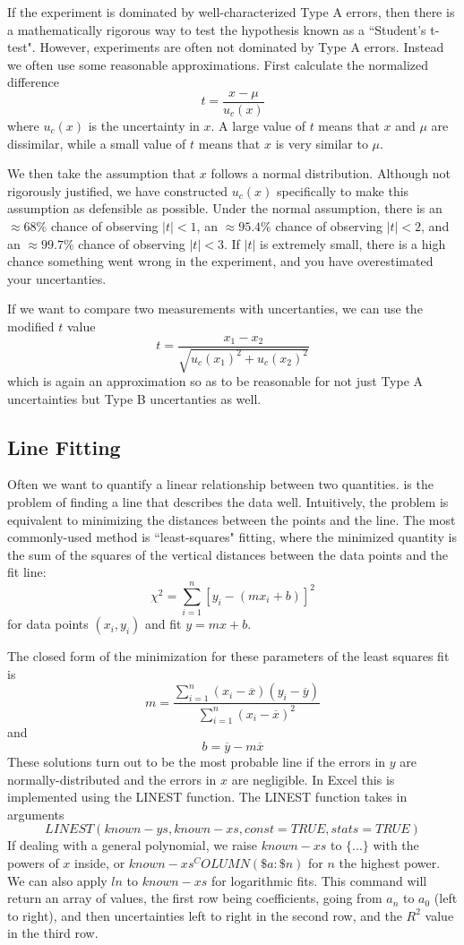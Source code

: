 \documentclass[12pt, a4paper, oneside, openright, titlepage]{book}
\begin{document}
\begin{appendices}
    If the experiment is dominated by well-characterized Type A errors, then there is a mathematically rigorous way to test the hypothesis known as a ``Student's t-test". However, experiments are often not dominated by Type A errors. Instead we often use some reasonable approximations. First calculate the normalized difference $$t = \frac{x-\mu}{u_c(x)}$$ where $u_c(x)$ is the uncertainty in $x$. A large value of $t$ means that $x$ and $\mu$ are dissimilar, while a small value of $t$ means that $x$ is very similar to $\mu$. 

    We then take the assumption that $x$ follows a normal distribution. Although not rigorously justified, we have constructed $u_c(x)$ specifically to make this assumption as defensible as possible. Under the normal assumption, there is an $\approx 68\%$ chance of observing $|t| < 1$, an $\approx 95.4\%$ chance of observing $|t| < 2$, and an $\approx 99.7\%$ chance of observing $|t| < 3$. If $|t|$ is extremely small, there is a high chance something went wrong in the experiment, and you have overestimated your uncertanties.

    If we want to compare two measurements with uncertanties, we can use the modified $t$ value $$t = \frac{x_1 - x_2}{\sqrt{u_c(x_1)^2+u_c(x_2)^2}}$$ which is again an approximation so as to be reasonable for not just Type A uncertainties but Type B uncertanties as well.


    \subsection{Line Fitting}
    
    Often we want to quantify a linear relationship between two quantities.  is the problem of finding a line that describes the data well. Intuitively, the problem is equivalent to minimizing the distances between the points and the line. The most commonly-used method is ``least-squares" fitting, where the minimized quantity is the sum of the squares of the vertical distances between the data points and the fit line: $$\chi^2 = \sum_{i=1}^n[y_i - (mx_i + b)]^2$$ for data points $(x_i,y_i)$ and fit $y = mx+b$.

    The closed form of the minimization for these parameters of the least squares fit is $$m = \frac{\sum_{i=1}^n(x_i-\overline{x})(y_i - \overline{y})}{\sum_{i=1}^n(x_i-\overline{x})^2}$$ and $$b = \overline{y} - m\overline{x}$$ These solutions turn out to be the most probable line if the errors in $y$ are normally-distributed and the errors in $x$ are negligible. In Excel this is implemented using the LINEST function. The LINEST function takes in arguments $$LINEST(known-ys,known-xs,const = TRUE,stats = TRUE)$$ If dealing with a general polynomial, we raise $known-xs$ to $\{...\}$ with the powers of $x$ inside, or $known-xs^COLUMN(\$a:\$n)$ for $n$ the highest power. We can also apply $ln$ to $known-xs$ for logarithmic fits. This command will return an array of values, the first row being coefficients, going from $a_n$ to $a_0$ (left to right), and then uncertainties left to right in the second row, and the $R^2$ value in the third row.
    

\end{appendices}
\end{document}
